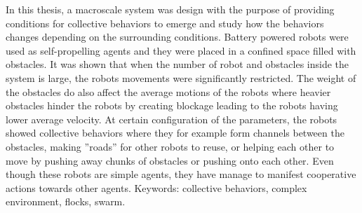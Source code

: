 In this thesis, a macroscale system was design with the purpose of providing conditions for collective behaviors to 
emerge and study how the behaviors changes depending on the surrounding conditions. 
Battery powered robots were used as self-propelling agents and they were placed in a confined space filled 
with obstacles.
It was shown that when the number of robot and obstacles inside the system is large, the robots movements were 
significantly restricted.
The weight of the obstacles do also affect the average motions of the robots where heavier obstacles 
hinder the robots by creating blockage leading to the robots having lower average velocity.
At certain configuration of the parameters, the robots showed collective behaviors where they 
for example form channels between the obstacles, making ''roads'' for other robots to reuse, or 
helping each other to move by pushing away chunks of obstacles or pushing onto each other.
Even though these robots are simple agents, they have manage to manifest cooperative actions towards other agents. 
\vfill
Keywords: collective behaviors, complex environment, flocks, swarm.

\newpage				%
\thispagestyle{empty}
\mbox{}
